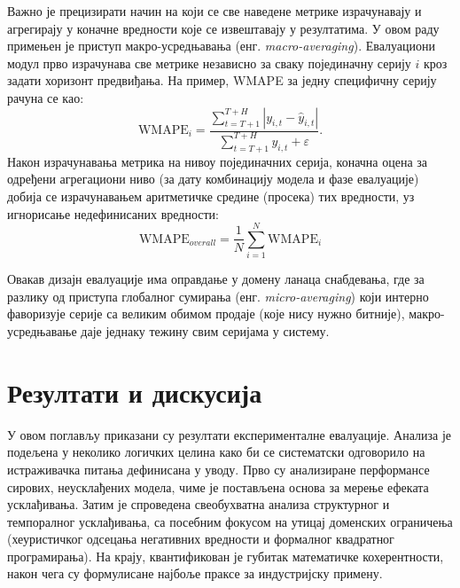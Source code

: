 \documentclass[12pt,oneside]{memoir}
\begin{document}
Важно је прецизирати начин на који се све наведене метрике израчунавају и агрегирају у коначне вредности које се извештавају у резултатима. У овом раду примењен је приступ макро-усредњавања (енг. \textit{macro-averaging}). Евалуациони модул прво израчунава све метрике независно за сваку појединачну серију $i$ кроз задати хоризонт предвиђања. На пример, WMAPE за једну специфичну серију рачуна се као:
\begin{equation}
    \mathrm{WMAPE}_i = \frac{\sum_{t=T+1}^{T+H} |y_{i,t} - \hat{y}_{i,t}|}{\sum_{t=T+1}^{T+H} y_{i,t} + \varepsilon}.
\end{equation}
Након израчунавања метрика на нивоу појединачних серија, коначна оцена за одређени агрегациони ниво (за дату комбинацију модела и фазе евалуације) добија се израчунавањем аритметичке средине (просека) тих вредности, уз игнорисање недефинисаних вредности:
\begin{equation}
    \mathrm{WMAPE}_{overall} = \frac{1}{N} \sum_{i=1}^{N} \mathrm{WMAPE}_i
\end{equation}


Овакав дизајн евалуације има оправдање у домену ланаца снабдевања, где за разлику од приступа глобалног сумирања (енг. \textit{micro-averaging}) који интерно фаворизује серије са великим обимом продаје (које нису нужно битније), макро-усредњавање даје једнаку тежину свим серијама у систему.




\chapter{Резултати и дискусија}
\label{chp:rezultati}

У овом поглављу приказани су резултати експерименталне евалуације. Анализа је подељена у неколико логичких целина како би се систематски одговорило на истраживачка питања дефинисана у уводу. Прво су анализиране перформансе сирових, неусклађених модела, чиме је постављена основа за мерење ефеката усклађивања. Затим је спроведена свеобухватна анализа структурног и темпоралног усклађивања, са посебним фокусом на утицај доменских ограничења (хеуристичког одсецања негативних вредности и формалног квадратног програмирања). На крају, квантификован је губитак математичке кохерентности, након чега су формулисане најбоље праксе за индустријску примену.
\end{document}
